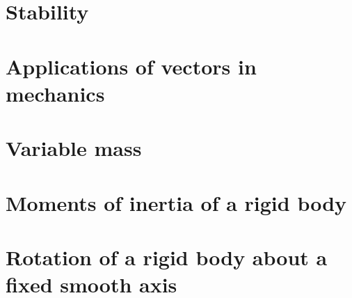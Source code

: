\documentclass[a4paper]{article}
\begin{document}
\section{Stability}

\section{Applications of vectors in mechanics}

\section{Variable mass}

\section{Moments of inertia of a rigid body}

\section{Rotation of a rigid body about a fixed smooth axis}




\printindex
\end{document}

